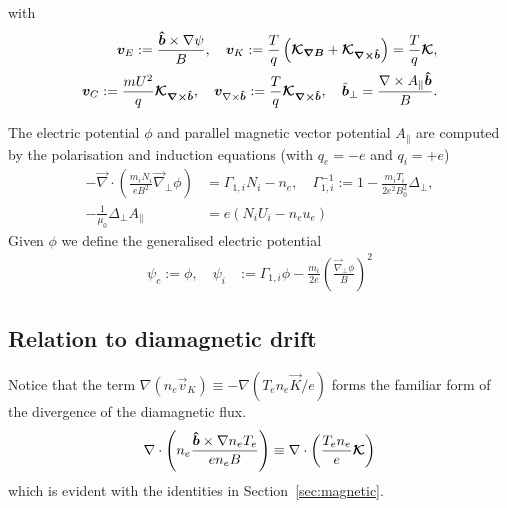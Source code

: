 with
\begin{align}
{\boldsymbol{v}}_E := \frac{\bm{\hat{b}}\times\nabla\psi}{B},\quad
{\boldsymbol{v}}_{K} := \frac{T}{q}\left({\boldsymbol{\mathcal K_{\nabla B}}} + {\boldsymbol{\mathcal K_{\nabla\times\bm{\hat{b}}}}}\right)=\frac{T}{q}{\boldsymbol{\mathcal K}}  ,\nonumber\\
{\boldsymbol{v}}_C := \frac{mU^2}{q}{\boldsymbol{\mathcal K_{\nabla\times\bm{\hat{b}}}}},\quad
{\boldsymbol{v}}_{\nabla\times\bm{\hat{b}}} := \frac{T}{q}{\boldsymbol{\mathcal K_{\nabla\times\bm{\hat{b}}}}},\quad
\tilde{{\boldsymbol{b}}}_\perp = \frac{\nabla\times A_\parallel \bm{\hat{b}}}{B}.
\label{}
\end{align}

The electric potential \(\phi\) and parallel magnetic vector potential \(A_\parallel\) are
computed by the polarisation and induction equations (with $q_e=-e$ and $q_i=+e$)
\begin{align}
 -\vec{\nabla} \cdot\left(\frac{m_iN_i}{e B^2} \vec{\nabla}_\perp \phi\right) &=  \Gamma_{1,i} N_i -n_e, \quad \Gamma_{1,i}^{-1} := 1-\frac{m_i T_i}{2e^2 B_0^2} \Delta_\perp , \\
  -\frac{1}{\mu_0} \Delta_\perp A_\parallel &= e\left(N_i U_i-n_e u_e \right)
  \label{eq:polarisation_dimensional}
\end{align}
Given $\phi$ we define the generalised electric potential
\begin{align}
    \psi_e := \phi,\quad \psi_i&:= \Gamma_{1,i} \phi - \frac{m_i }{2 e}\left(\frac{\vec \nabla_\perp\phi}{B}\right)^2
\end{align}
\subsection{Relation to diamagnetic drift}
Notice that the term $\nabla (n_e \vec v_K ) \equiv -\nabla (T_e n_e \vec K /e) $
forms the familiar form of the divergence of the diamagnetic flux.
\begin{align}
\nabla\cdot\left( n_e \frac{\bm{\hat{b}} \times \nabla n_e T_e}{en_e B}\right) \equiv  \nabla\cdot \left(\frac{T_e n_e}{e} {\boldsymbol{ \mathcal K}}\right)
\end{align}
which is evident with the identities in Section~\ref{sec:magnetic}.

